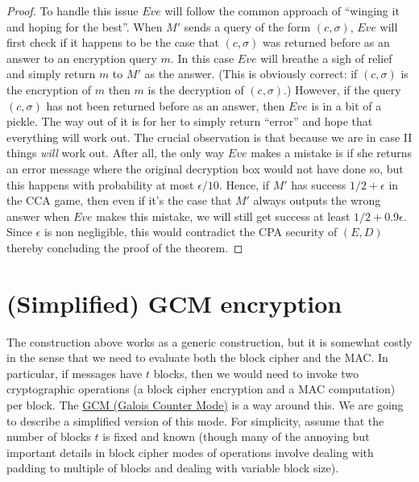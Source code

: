 \begin{proof}
To handle this issue \(Eve\) will follow the common approach of
``winging it and hoping for the best''. When \(M'\) sends a query of the
form \((c,\sigma)\), \(Eve\) will first check if it happens to be the
case that \((c,\sigma)\) was returned before as an answer to an
encryption query \(m\). In this case \(Eve\) will breathe a sigh of
relief and simply return \(m\) to \(M'\) as the answer. (This is
obviously correct: if \((c,\sigma)\) is the encryption of \(m\) then
\(m\) is the decryption of \((c,\sigma)\).) However, if the query
\((c,\sigma)\) has not been returned before as an answer, then \(Eve\)
is in a bit of a pickle. The way out of it is for her to simply return
``error'' and hope that everything will work out. The crucial
observation is that because we are in case II things \emph{will} work
out. After all, the only way \(Eve\) makes a mistake is if she returns
an error message where the original decryption box would not have done
so, but this happens with probability at most \(\epsilon/10\). Hence, if
\(M'\) has success \(1/2+\epsilon\) in the CCA game, then even if it's
the case that \(M'\) always outputs the wrong answer when \(Eve\) makes
this mistake, we will still get success at least \(1/2+0.9\epsilon\).
Since \(\epsilon\) is non negligible, this would contradict the CPA
security of \((E,D)\) thereby concluding the proof of the theorem.

\end{proof}


\section{(Simplified) GCM encryption}\label{6-Simplified-GCM-encrypt}

The construction above works as a generic construction, but it is
somewhat costly in the sense that we need to evaluate both the block
cipher and the MAC. In particular, if messages have \(t\) blocks, then
we would need to invoke two cryptographic operations (a block cipher
encryption and a MAC computation) per block. The
\href{https://goo.gl/uz6WgS}{GCM (Galois Counter Mode)} is a way around
this. We are going to describe a simplified version of this mode. For
simplicity, assume that the number of blocks \(t\) is fixed and known
(though many of the annoying but important details in block cipher modes
of operations involve dealing with padding to multiple of blocks and
dealing with variable block size).

